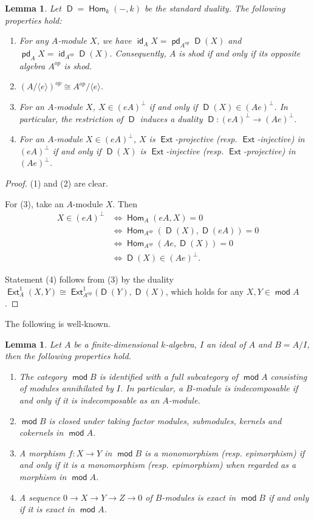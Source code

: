 \documentclass[12pt,a4paper,reqno]{amsart}
\newtheorem{lemma}[theorem]{Lemma}
\theoremstyle{definition}
\newcommand{\opname}[1]{\operatorname{\mathsf{#1}}}
\renewcommand{\mod}{\opname{mod}\nolimits}
\newcommand{\pd}{\opname{pd}}
\newcommand{\id}{\opname{id}}
\newcommand{\Du}{\opname{D}\nolimits}
\newcommand{\Hom}{\opname{Hom}}
\newcommand{\Ext}{\opname{Ext}}
\begin{document}
\begin{lemma}\label{l: duality-properties}
Let $\Du = \Hom_k(-, k)$ be the standard duality. The following properties hold: 
\begin{enumerate}
\item For any $A$-module $X$, we have $\id_A X = \pd_{A^{op}} \Du (X)$ and $\pd_A X = \id_{A^{op}} \Du (X)$. Consequently, $A$ is shod if and only if its opposite algebra $A^{op}$ is shod.
\item $(A / \langle e \rangle)^{op} \cong A^{op} / \langle e \rangle$.
\item For an $A$-module $X$, $X \in (eA)^\perp$ if and only if $\Du(X) \in (A e)^\perp$. In particular, the restriction of $\Du$ induces a duality $\Du: (eA)^\perp \to (A e)^\perp$.
\item For an $A$-module $X \in (eA)^\perp$, $X$ is $\Ext$-projective (resp. $\Ext$-injective) in $(eA)^\perp$ if and only if $\Du(X)$ is $\Ext$-injective (resp. $\Ext$-projective) in $(Ae)^\perp$.
\end{enumerate}
\end{lemma}
\begin{proof}
(1) and (2) are clear. 

For (3), take an $A$-module $X$.  Then
\begin{align*}
X \in (eA)^\perp &\iff \Hom_A (eA, X) = 0 \\
&\iff \Hom_{A^{op}} (\Du(X), \Du(eA)) = 0 \\
&\iff \Hom_{A^{op}} (A e, \Du(X)) = 0 \\
&\iff \Du(X) \in (A e)^\perp.
\end{align*}

Statement (4) follows from (3) by the duality $\Ext_A^1(X, Y) \cong \Ext_{A^{\text{op}}}^1(\Du(Y), \Du(X)$, which holds for any $X, Y \in \mod A$.
\end{proof} 
The following is well-known.
\begin{lemma}\label{l:cat-of-factor-ring}
Let $A$ be a finite-dimensional $k$-algebra, $I$ an ideal of $A$ and $B = A/I$, then the following properties hold.
\begin{enumerate}
\item The category $\mod B$ is identified with a full subcategory of $\mod A$ consisting of modules annihilated by $I$. In particular, a $B$-module is indecomposable if and only if it is  indecomposable as an $A$-module.
\item $\mod B$ is closed under taking factor modules, submodules, kernels and cokernels in $\mod A$.
\item A morphism $f : X \to Y$ in $\mod B$ is a monomorphism (resp. epimorphism)  if and only if it is a monomorphism (resp. epimorphism) when regarded as a morphism in $\mod A$.
\item A sequence $0 \to X \to Y \to Z \to 0$ of $B$-modules is exact in $\mod B$ if and only if it is exact  in $\mod A$.
\end{enumerate}
\end{lemma}
\end{document}

